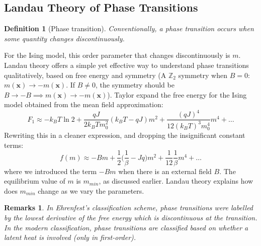 \documentclass[a4paper]{article}
\newtheorem{remarks}{Remarks}[section]
\theoremstyle{new}
\newtheorem{defi}{Definition}[section]
\begin{document}
\subsection{Landau Theory of Phase Transitions}
\begin{defi}[Phase transition]
Conventionally, a phase transition occurs when some quantity changes discontinuously.
\end{defi}
For the Ising model, this order parameter that changes discontinuously is $m$. Landau theory offers a simple yet effective way to understand phase transitions qualitatively, based on free energy and symmetry (A $\mathbb{Z}_2$ symmetry when $B=0$: $m(\mathbf{x})\rightarrow-m(\mathbf{x})$. If $B\neq 0$, the symmetry should be $B\rightarrow -B\implies m(\mathbf{x})\rightarrow-m(\mathbf{x})$). Taylor expand the free energy for the Ising model obtained from the mean field approximation:
$$F_1\approx -k_BT\ln 2+\frac{qJ}{2k_BTm_0^2}(k_BT-qJ)m^2+\frac{(qJ)^4}{12(k_BT)^3m_0^4}m^4+\dots$$
Rewriting this in a cleaner expression, and dropping the insignificant constant terms:
$$f(m)\approx-Bm+\frac{1}{2}\bigg(\frac{1}{\beta}-Jq\bigg)m^2+\frac{1}{12}\frac{1}{\beta}m^4+\dots$$
where we introduced the term $-Bm$ when there is an external field $B$. The equilibrium value of $m$ is $m_{min}$, as discussed earlier. Landau theory explains how does $m_{min}$ change as we vary the parameters.
\begin{remarks}
In Ehrenfest's classification scheme, phase transitions were labelled by the lowest derivative of the free energy which is discontinuous at the transition. In the modern classification, phase transitions are classified based on whether a latent heat is involved (only in first-order).
\end{remarks}
\end{document}
